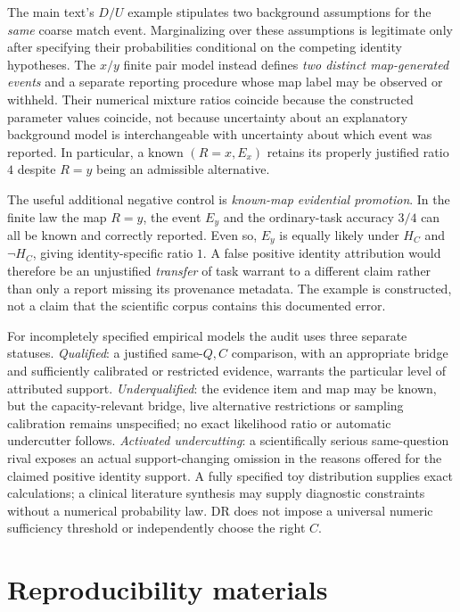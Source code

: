 \documentclass[11pt]{article}
\begin{document}
The main text's \(D/U\) example stipulates two background assumptions for the \emph{same} coarse match event. Marginalizing over these assumptions is legitimate only after specifying their probabilities conditional on the competing identity hypotheses. The \(x/y\) finite pair model instead defines \emph{two distinct map-generated events} and a separate reporting procedure whose map label may be observed or withheld. Their numerical mixture ratios coincide because the constructed parameter values coincide, not because uncertainty about an explanatory background model is interchangeable with uncertainty about which event was reported. In particular, a known \((R=x,E_x)\) retains its properly justified ratio \(4\) despite \(R=y\) being an admissible alternative.

The useful additional negative control is \emph{known-map evidential promotion}. In the finite law the map \(R=y\), the event \(E_y\) and the ordinary-task accuracy \(3/4\) can all be known and correctly reported. Even so, \(E_y\) is equally likely under \(H_C\) and \(\neg H_C\), giving identity-specific ratio \(1\). A false positive identity attribution would therefore be an unjustified \emph{transfer} of task warrant to a different claim rather than only a report missing its provenance metadata. The example is constructed, not a claim that the scientific corpus contains this documented error.

For incompletely specified empirical models the audit uses three separate statuses. \emph{Qualified}: a justified same-\(Q,C\) comparison, with an appropriate bridge and sufficiently calibrated or restricted evidence, warrants the particular level of attributed support. \emph{Underqualified}: the evidence item and map may be known, but the capacity-relevant bridge, live alternative restrictions or sampling calibration remains unspecified; no exact likelihood ratio or automatic undercutter follows. \emph{Activated undercutting}: a scientifically serious same-question rival exposes an actual support-changing omission in the reasons offered for the claimed positive identity support. A fully specified toy distribution supplies exact calculations; a clinical literature synthesis may supply diagnostic constraints without a numerical probability law. DR does not impose a universal numeric sufficiency threshold or independently choose the right \(C\).

\section{Reproducibility materials}
\end{document}
